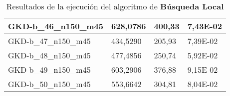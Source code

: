 \begin{table}[!ht]
\begin{adjustbox}{height=12cm}
\begin{tabular}{|l|l|l|l|}
        GKD-b\_46\_n150\_m45 & 628,0786 & 400,33 & 7,43E-02 \\ \hline
        GKD-b\_47\_n150\_m45 & 434,5290 & 205,93 & 7,39E-02 \\ \hline
        GKD-b\_48\_n150\_m45 & 477,4856 & 250,74 & 5,92E-02 \\ \hline
        GKD-b\_49\_n150\_m45 & 603,2906 & 376,88 & 9,15E-02 \\ \hline
        GKD-b\_50\_n150\_m45 & 553,6642 & 304,81 & 8,04E-02 \\ \hline
    \end{tabular}
    \end{adjustbox}
    \caption{Resultados de la ejecución del algoritmo de \textbf{Búsqueda Local}}
\end{table}

\pagebreak